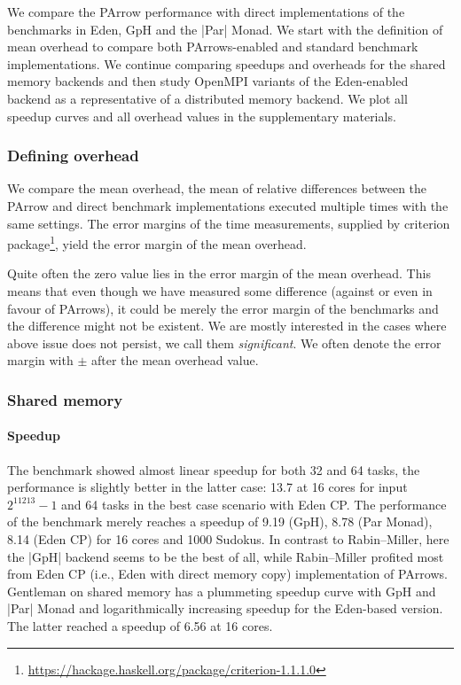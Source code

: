 We compare the PArrow performance with direct implementations of the benchmarks in Eden, GpH and the |Par| Monad.
We start with the definition of mean overhead to compare both PArrows-enabled and standard benchmark implementations. We continue comparing speedups and overheads for the shared memory backends and then study OpenMPI variants of the Eden-enabled backend as a representative of a distributed memory backend. We plot all speedup curves and all overhead values in the supplementary materials.

\subsubsection{Defining overhead}

We compare the mean overhead, \ie the mean of relative differences between the PArrow and direct benchmark implementations executed multiple times with the same settings.
The error margins of the time measurements, supplied by criterion package\footnote{\url{https://hackage.haskell.org/package/criterion-1.1.1.0}}, yield the error margin of the mean overhead. 

Quite often the zero value lies in the error margin of the mean overhead. This means that even though we have measured some difference (against or even in favour of PArrows), it could be merely the error margin of the benchmarks and the difference might not be existent. We are mostly interested in the cases where above issue does not persist, we call them \emph{significant}. We often denote the error margin with $\pm$ after the mean overhead value.

\subsubsection{Shared memory}

\paragraph{Speedup}
The \rmtest benchmark showed almost linear speedup for both 32 and 64 tasks, the performance is slightly better in the latter case: 13.7 at 16 cores for input $2^{11213}-1$ and 64 tasks in the best case scenario with Eden CP. The performance of the \sudokutest benchmark merely reaches a speedup of 9.19 (GpH), 8.78 (Par Monad), 8.14 (Eden CP) for 16 cores and 1000 Sudokus. In contrast to Rabin--Miller, here the |GpH| backend seems to be the best of all, while Rabin--Miller profited most from Eden CP (i.e., Eden with direct memory copy) implementation of PArrows. Gentleman on shared memory has a plummeting speedup curve with GpH and |Par| Monad and logarithmically increasing speedup for the Eden-based version. The latter reached a speedup of 6.56 at 16 cores.

